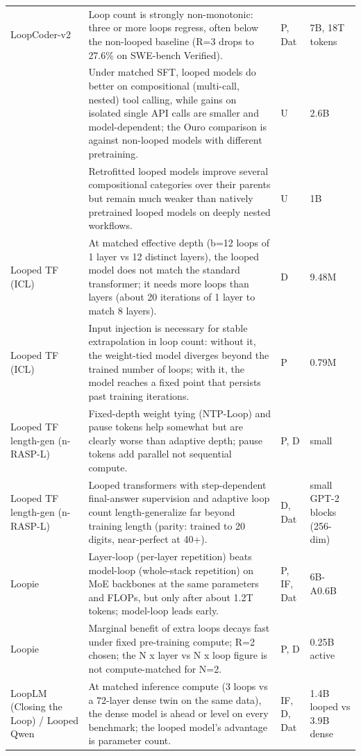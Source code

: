 \begin{longtable}{@{}>{\raggedright\arraybackslash}p{2.7cm}>{\raggedright\arraybackslash}p{7.9cm}>{\raggedright\arraybackslash}p{1.3cm}>{\raggedright\arraybackslash}p{2.5cm}@{}}
LoopCoder-v2~\citep{ax2606.18023} & Loop count is strongly non-monotonic: three or more loops regress, often below the non-looped baseline (R=3 drops to 27.6\% on SWE-bench Verified). & P, Dat & 7B, 18T tokens \\
\citep{ax2608.18171} & Under matched SFT, looped models do better on compositional (multi-call, nested) tool calling, while gains on isolated single API calls are smaller and model-dependent; the Ouro comparison is against non-looped models with different pretraining. & U & 2.6B \\
\citep{ax2608.18171} & Retrofitted looped models improve several compositional categories over their parents but remain much weaker than natively pretrained looped models on deeply nested workflows. & U & 1B \\
Looped TF (ICL)~\citep{ax2311.12424} & At matched effective depth (b=12 loops of 1 layer vs 12 distinct layers), the looped model does not match the standard transformer; it needs more loops than layers (about 20 iterations of 1 layer to match 8 layers). & D & 9.48M \\
Looped TF (ICL)~\citep{ax2311.12424} & Input injection is necessary for stable extrapolation in loop count: without it, the weight-tied model diverges beyond the trained number of loops; with it, the model reaches a fixed point that persists past training iterations. & P & 0.79M \\
Looped TF length-gen (n-RASP-L)~\citep{ax2409.15647} & Fixed-depth weight tying (NTP-Loop) and pause tokens help somewhat but are clearly worse than adaptive depth; pause tokens add parallel not sequential compute. & P, D & small \\
Looped TF length-gen (n-RASP-L)~\citep{ax2409.15647} & Looped transformers with step-dependent final-answer supervision and adaptive loop count length-generalize far beyond training length (parity: trained to 20 digits, near-perfect at 40+). & D, Dat & small GPT-2 blocks (256-dim) \\
Loopie~\citep{ax2607.16051} & Layer-loop (per-layer repetition) beats model-loop (whole-stack repetition) on MoE backbones at the same parameters and FLOPs, but only after about 1.2T tokens; model-loop leads early. & P, IF, Dat & 6B-A0.6B \\
Loopie~\citep{ax2607.16051} & Marginal benefit of extra loops decays fast under fixed pre-training compute; R=2 chosen; the N x layer vs N x loop figure is not compute-matched for N=2. & P, D & 0.25B active \\
LoopLM (Closing the Loop) /\allowbreak{} Looped Qwen~\citep{ax2610.00673} & At matched inference compute (3 loops vs a 72-layer dense twin on the same data), the dense model is ahead or level on every benchmark; the looped model's advantage is parameter count. & IF, D, Dat & 1.4B looped vs 3.9B dense \\

\end{longtable}

